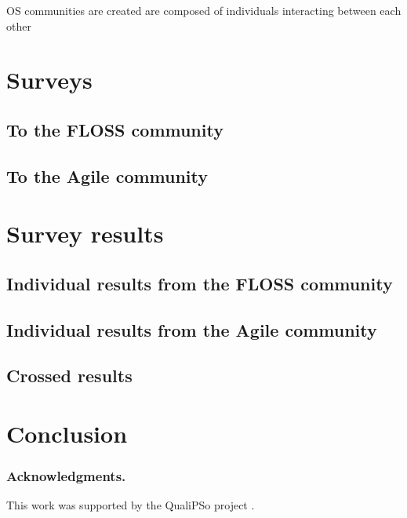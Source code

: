 \documentclass[lnbip]{svmultln}
\begin{document}
OS communities are created are composed of individuals interacting between each other 

\section{Surveys}
\label{sec:surveys}

\subsection{To the FLOSS community}
\label{subsec:floss-survey}


\subsection{To the Agile community}
\label{subsec:agile-survey}

\section{Survey results}
\label{sec:results}

\subsection{Individual results from the FLOSS community}
\label{subsec:floss-results}

\subsection{Individual results from the Agile community}
\label{subsec:agile-results}

\subsection{Crossed results}
\label{subsec:crossed-results}

\section{Conclusion}
\label{sec:conclusion}


\subsubsection*{Acknowledgments.}

This work was supported by the QualiPSo project \cite{url:qualipso}.
\end{document}
